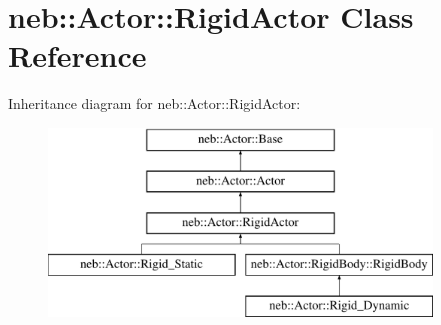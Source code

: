 \hypertarget{classneb_1_1Actor_1_1RigidActor}{\section{neb\-:\-:\-Actor\-:\-:\-Rigid\-Actor \-Class \-Reference}
\label{classneb_1_1Actor_1_1RigidActor}
}
\-Inheritance diagram for neb\-:\-:\-Actor\-:\-:\-Rigid\-Actor\-:\begin{figure}[H]
\begin{center}
\leavevmode
\includegraphics[height=5.000000cm]{classneb_1_1Actor_1_1RigidActor}
\end{center}
\end{figure}
